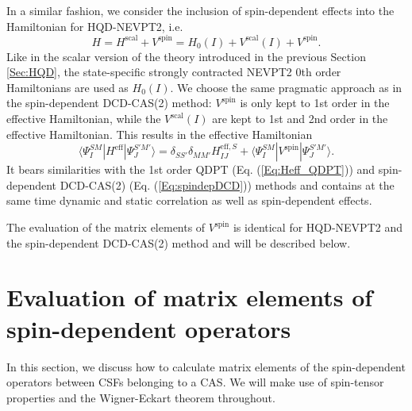 In a similar fashion, we consider the inclusion of spin-dependent effects into the Hamiltonian for HQD-NEVPT2, i.e.
	\begin{equation}
	H = {H^{{\text{scal}}}} + {V^{{\text{spin}}}} = {H_0}(I) + {V^{{\text{scal}}}}(I) + {V^{{\text{spin}}}}.
	\end{equation} 	
Like in the scalar version of the theory introduced in the previous Section \ref{Sec:HQD}, the state-specific strongly contracted NEVPT2 0th order Hamiltonians are used as ${H_0}(I)$. We choose the same pragmatic approach as in the spin-dependent DCD-CAS(2) method: ${V^{{\text{spin}}}}$ is only kept to 1st order in the effective Hamiltonian, while the ${V^{{\text{scal}}}}(I)$ are kept to 1st and 2nd order in the effective Hamiltonian. This results in the effective Hamiltonian
	\begin{equation}
	\langle \Psi _I^{SM}|H^\text{eff}|\Psi _J^{S'M'}\rangle = {\delta _{SS'}}{\delta _{MM'}}H_{IJ}^{{\text{eff}},S} + \langle \Psi _I^{SM}|{V^{{\text{spin}}}}|\Psi _J^{S'M'}\rangle. 
	\end{equation} 	
It bears similarities with the 1st order QDPT (Eq. (\ref{Eq:Heff_QDPT})) and spin-dependent DCD-CAS(2) (Eq. (\ref{Eq:spindepDCD})) methods and contains at the same time dynamic and static correlation as well as spin-dependent effects.

The evaluation of the matrix elements of ${V^{{\text{spin}}}}$ is identical for HQD-NEVPT2 and the spin-dependent DCD-CAS(2) method and will be described below.

\section{Evaluation of matrix elements of spin-dependent operators}
In this section, we discuss how to calculate matrix elements of the spin-dependent operators between CSFs belonging to a CAS. We will make use of spin-tensor properties and the Wigner-Eckart theorem\cite{Wigne_1959_} throughout.

